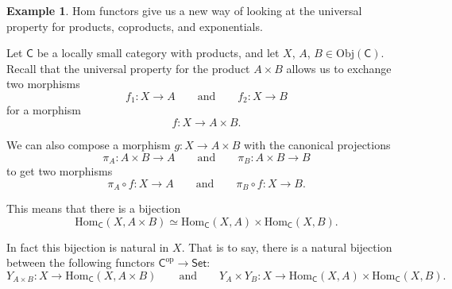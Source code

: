\documentclass[a4paper,10pt]{scrreprt}
\newcommand{\Obj}{\mathrm{Obj}}
\newcommand{\Hom}{\mathrm{Hom}}
\theoremstyle{definition}
\newtheorem{example}{Example}[section]
\theoremstyle{plain}
\theoremstyle{remark}
\begin{document}
\begin{example}
  \label{eg:naturaltransformationsforcccs}
  Hom functors give us a new way of looking at the universal property for products, coproducts, and exponentials.

  Let $\mathsf{C}$ be a locally small category with products, and let $X$, $A$, $B \in \Obj(\mathsf{C})$. Recall that the universal property for the product $A \times B$ allows us to exchange two morphisms
  \begin{equation*}
    f_{1}\colon X \to A\qquad\text{and}\qquad f_{2}\colon X \to B
  \end{equation*}
  for a morphism
  \begin{equation*}
    f\colon X \to A \times B.
  \end{equation*}

  We can also compose a morphism $g\colon X \to A \times B$ with the canonical projections
  \begin{equation*}
    \pi_{A}\colon A \times B \to A \qquad\text{and}\qquad \pi_{B}\colon A \times B \to B
  \end{equation*}
  to get two morphisms
  \begin{equation*}
    \pi_{A} \circ f\colon X \to A\qquad\text{and}\qquad \pi_{B} \circ f\colon X \to B.
  \end{equation*}

  This means that there is a bijection 
  \begin{equation*}
    \Hom_{\mathsf{C}}(X, A \times B) \simeq \Hom_{\mathsf{C}}(X, A) \times \Hom_{\mathsf{C}}(X, B).
  \end{equation*}

  In fact this bijection is natural in $X$. That is to say, there is a natural bijection between the following functors $\mathsf{C}^{\mathrm{op}} \to \mathsf{Set}$:
  \begin{equation*}
    Y_{A \times B}\colon X \to \Hom_{\mathsf{C}}(X, A \times B)\qquad\text{and}\qquad Y_{A} \times Y_{B}\colon X \to \Hom_{\mathsf{C}}(X, A) \times \Hom_{\mathsf{C}}(X, B).
  \end{equation*}


\end{example}
\end{document}
